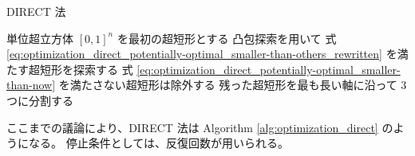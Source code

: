 \begin{algorithm}[tp]
    \caption{DIRECT 法}
    \label{alg:optimization_direct}
    \begin{algorithmic}
            \State 単位超立方体 $[0, 1]^n$ を最初の超短形とする
            \Loop
                \State 凸包探索を用いて
                    式 \eqref{eq:optimization_direct_potentially-optimal_smaller-than-others_rewritten}
                    を満たす超短形を探索する
                \State 式 \eqref{eq:optimization_direct_potentially-optimal_smaller-than-now}
                    を満たさない超短形は除外する
                \State 残った超短形を最も長い軸に沿って 3 つに分割する
                    \State \Return
                \EndIf
            \EndLoop
        \EndProcedure
    \end{algorithmic}
\end{algorithm}

ここまでの議論により、DIRECT 法は
Algorithm \ref{alg:optimization_direct} のようになる。
停止条件としては、反復回数が用いられる。
